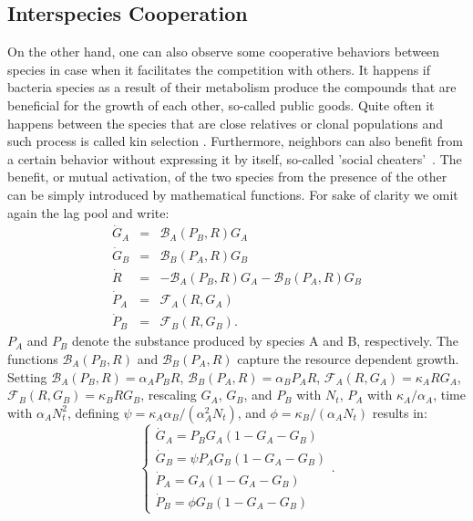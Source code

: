 \documentclass[10pt,A4paper]{article}
\numberwithin{equation}{section}
\begin{document}
\subsection{Interspecies Cooperation}
On the other hand, one can also observe some cooperative behaviors between species in case when it facilitates the competition with others.
It happens if bacteria species as a result of their metabolism produce the compounds that are beneficial for the growth of each other, so-called public goods.
Quite often it happens between the species that are close relatives or clonal populations and such process is called kin selection \cite{west_social_2007}.
Furthermore, neighbors can also benefit from a certain behavior without expressing it by itself, so-called 'social cheaters'~\cite{rainey_evolution_2003}.
%
%
The benefit, or mutual activation, of the two species from the presence of the other can be simply introduced by mathematical functions.
For sake of clarity we omit again the lag pool and write:
\begin{eqnarray}
    \dot{G}_A &=& \mathcal{B}_A(P_B,R)G_A\\
    \dot{G}_B &=& \mathcal{B}_B(P_A,R)G_B\\
    \dot{R} &=&-\mathcal{B}_A(P_B,R)G_A-\mathcal{B}_B(P_A,R)G_B\\
    \dot{P}_A &=& \mathcal{F}_A(R,G_A)\\
    \dot{P}_B &=& \mathcal{F}_B(R,G_B).
\end{eqnarray}
$P_A$ and $P_B$ denote the substance produced by species A and B, respectively.
The functions $\mathcal{B}_A(P_B,R)$ and $\mathcal{B}_B(P_A,R)$ capture the resource dependent growth.
Setting $\mathcal{B}_A(P_B,R)=\alpha_A P_BR$, $\mathcal{B}_B(P_A,R)=\alpha_B P_A R$, $\mathcal{F}_A(R,G_A)=\kappa_A RG_A$, $\mathcal{F}_B(R,G_B)=\kappa_B RG_B$, rescaling $G_A$, $G_B$, and $P_B$ with $N_t$, $P_A$ with $\kappa_A/\alpha_A$, time with $\alpha_AN_t^2$, defining $\psi=\kappa_A\alpha_B/(\alpha_A^2N_t)$, and $\phi=\kappa_B/(\alpha_A N_t)$ results in:
\begin{equation}
    \begin{cases}
    \dot{G}_A = P_B G_A\left(1 - G_A-G_B\right)\\
    \dot{G}_B = \psi P_A G_B\left(1 - G_A-G_B\right)\\
    \dot{P}_A = G_A\left(1 - G_A-G_B\right)\\
    \dot{P}_B =\phi G_B\left(1 - G_A-G_B\right)
    \end{cases}.
    \label{eq:1pool_2sp_cooper}
\end{equation}
\end{document}
